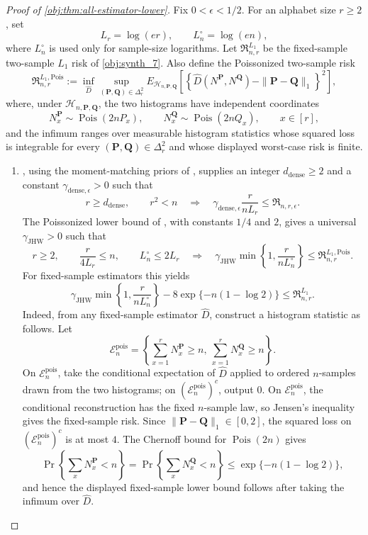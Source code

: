\begin{proof}[Proof of \cref{obj:thm:all-estimator-lower}]
Fix \(0<\epsilon<1/2\).  For an alphabet size \(r\ge2\), set
\[
L_r=\log(er),
\qquad
L_n^\circ=\log(en),
\]
where \(L_n^\circ\) is used only for sample-size logarithms.  Let
\(\mathfrak R^{L_1}_{n,r}\) be the fixed-sample two-sample \(L_1\) risk of
\cref{obj:synth_7}.  Also define the Poissonized two-sample risk
\[
\mathfrak R^{L_1,\mathrm{Pois}}_{n,r}
:=
\inf_{\widehat D}
\sup_{(\mathbf P,\mathbf Q)\in\Delta_r^2}
E_{\mathcal H_{n,\mathbf P,\mathbf Q}}
\left[
\left\{\widehat D(N^{\mathbf P},N^{\mathbf Q})
-\|\mathbf P-\mathbf Q\|_1\right\}^2
\right],
\]
where, under \(\mathcal H_{n,\mathbf P,\mathbf Q}\), the two histograms have
independent coordinates
\[
N^{\mathbf P}_x\sim\operatorname{Pois}(2nP_x),
\qquad
N^{\mathbf Q}_x\sim\operatorname{Pois}(2nQ_x),
\qquad x\in[r],
\]
and the infimum ranges over measurable histogram statistics whose squared loss
is integrable for every \((\mathbf P,\mathbf Q)\in\Delta_r^2\) and whose
displayed worst-case risk is finite.

\begin{enumerate}
\item
{}, using the moment-matching priors of
\citep[Lemma 1 and Section 3.1]{CaiLow2011L1}, supplies an integer
\(d_{\mathrm{dense}}\ge2\) and a constant
\(\gamma_{\mathrm{dense},\epsilon}>0\) such that
\[
r\ge d_{\mathrm{dense}},\qquad r^2<n
\quad\Longrightarrow\quad
\gamma_{\mathrm{dense},\epsilon}\frac{r}{nL_r}
\le
\mathfrak R_{n,r,\epsilon}.
\]
The Poissonized lower bound of
\citep[Theorem 3, equation (24), and Section 3.1]{JiaoHanWeissman2018L1},
with constants \(1/4\) and \(2\), gives a universal
\(\gamma_{\mathrm{JHW}}>0\) such that
\[
r\ge2,\qquad
\frac{r}{4L_r}\le n,\qquad
L_n^\circ\le2L_r
\quad\Longrightarrow\quad
\gamma_{\mathrm{JHW}}
\min\left\{1,\frac{r}{nL_n^\circ}\right\}
\le
\mathfrak R^{L_1,\mathrm{Pois}}_{n,r}.
\]
For fixed-sample estimators this yields
\[
\gamma_{\mathrm{JHW}}
\min\left\{1,\frac{r}{nL_n^\circ}\right\}
-
8\exp\{-n(1-\log2)\}
\le
\mathfrak R^{L_1}_{n,r}.
\]
Indeed, from any fixed-sample estimator \(\widehat D\), construct a histogram
statistic as follows.  Let
\[
\mathcal E_n^{\mathrm{pois}}
=
\left\{
\sum_{x=1}^r N^{\mathbf P}_x\ge n,\ 
\sum_{x=1}^r N^{\mathbf Q}_x\ge n
\right\}.
\]
On \(\mathcal E_n^{\mathrm{pois}}\), take the conditional expectation of
\(\widehat D\) applied to ordered \(n\)-samples drawn from the two histograms;
on \((\mathcal E_n^{\mathrm{pois}})^c\), output \(0\).  On
\(\mathcal E_n^{\mathrm{pois}}\), the conditional reconstruction has the
fixed \(n\)-sample law, so Jensen's inequality gives the fixed-sample risk.
Since \(\|\mathbf P-\mathbf Q\|_1\in[0,2]\), the squared loss on
\((\mathcal E_n^{\mathrm{pois}})^c\) is at most \(4\).  The Chernoff bound for
\(\operatorname{Pois}(2n)\) gives
\[
\Pr\left\{\sum_x N^{\mathbf P}_x<n\right\}
=
\Pr\left\{\sum_x N^{\mathbf Q}_x<n\right\}
\le
\exp\{-n(1-\log2)\},
\]
and hence the displayed fixed-sample lower bound follows after taking the
infimum over \(\widehat D\).


\end{enumerate}
\end{proof}
